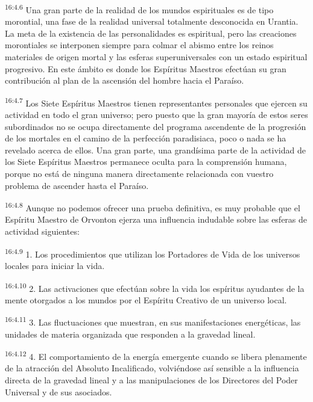 \par
\textsuperscript{16:4.6} Una gran parte de la realidad de los mundos espirituales es de tipo morontial, una fase de la realidad universal totalmente desconocida en Urantia. La meta de la existencia de las personalidades es espiritual, pero las creaciones morontiales se interponen siempre para colmar el abismo entre los reinos materiales de origen mortal y las esferas superuniversales con un estado espiritual progresivo. En este ámbito es donde los Espíritus Maestros efectúan su gran contribución al plan de la ascensión del hombre hacia el Paraíso.

\par
\textsuperscript{16:4.7} Los Siete Espíritus Maestros tienen representantes personales que ejercen su actividad en todo el gran universo; pero puesto que la gran mayoría de estos seres subordinados no se ocupa directamente del programa ascendente de la progresión de los mortales en el camino de la perfección paradisiaca, poco o nada se ha revelado acerca de ellos. Una gran parte, una grandísima parte de la actividad de los Siete Espíritus Maestros permanece oculta para la comprensión humana, porque no está de ninguna manera directamente relacionada con vuestro problema de ascender hasta el Paraíso.

\par
\textsuperscript{16:4.8} Aunque no podemos ofrecer una prueba definitiva, es muy probable que el Espíritu Maestro de Orvonton ejerza una influencia indudable sobre las esferas de actividad siguientes:

\par
\textsuperscript{16:4.9} 1. Los procedimientos que utilizan los Portadores de Vida de los universos locales para iniciar la vida.

\par
\textsuperscript{16:4.10} 2. Las activaciones que efectúan sobre la vida los espíritus ayudantes de la mente otorgados a los mundos por el Espíritu Creativo de un universo local.

\par
\textsuperscript{16:4.11} 3. Las fluctuaciones que muestran, en sus manifestaciones energéticas, las unidades de materia organizada que responden a la gravedad lineal.

\par
\textsuperscript{16:4.12} 4. El comportamiento de la energía emergente cuando se libera plenamente de la atracción del Absoluto Incalificado, volviéndose así sensible a la influencia directa de la gravedad lineal y a las manipulaciones de los Directores del Poder Universal y de sus asociados.

